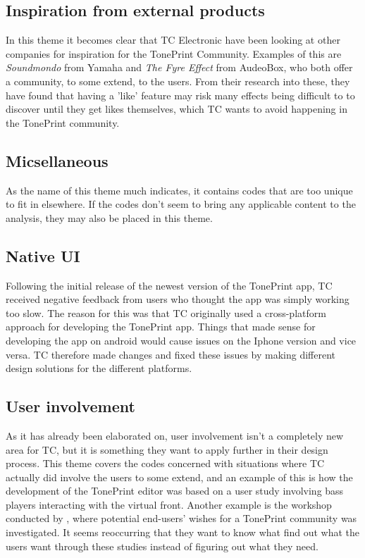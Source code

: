\subsection*{Inspiration from external products} 
\label{App:ThemeInspirationFromExternalProducts}
In this theme it becomes clear that TC Electronic have been looking at other companies for inspiration for the TonePrint Community. Examples of this are \textit{Soundmondo} from Yamaha and \textit{The Fyre Effect} from AudeoBox, who both offer a community, to some extend, to the users. From their research into these, they have found that having a 'like' feature may risk many effects being difficult to to discover until they get likes themselves, which TC wants to avoid happening in the TonePrint community.

\subsection*{Micsellaneous} 
\label{App:ThemeMiscellaneous}
As the name of this theme much indicates, it contains codes that are too unique to fit in elsewhere. If the codes don't seem to bring any applicable content to the analysis, they may also be placed in this theme.

\subsection*{Native UI}
\label{App:ThemeNativeUI}
Following the initial release of the newest version of the TonePrint app, TC received negative feedback from users who thought the app was simply working too slow. The reason for this was that TC originally used a cross-platform approach for developing the TonePrint app. Things that made sense for developing the app on android would cause issues on the Iphone version and vice versa. TC therefore made changes and fixed these issues by making different design solutions for the different platforms.

\subsection*{User involvement} 
\label{App:ThemeUserInvolvement}
As it has already been elaborated on, user involvement isn't a completely new area for TC, but it is something they want to apply further in their design process. This theme covers the codes concerned with situations where TC actually did involve the users to some extend, and an example of this is how the development of the TonePrint editor was based on a user study involving bass players interacting with the virtual front. Another example is the workshop conducted by \textcite{PDF:BrugerWorkshopUserTonePrints}, where potential end-users' wishes for a TonePrint community was investigated. It seems reoccurring that they want to know what find out what the users want through these studies instead of figuring out what they need.

